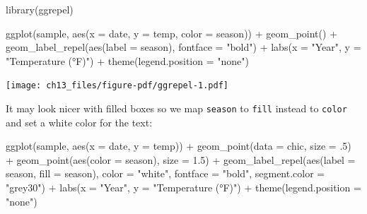 \documentclass[
  letterpaper,
]{scrbook}
\newenvironment{Shaded}{\begin{snugshade}}{\end{snugshade}}
\newcommand{\AttributeTok}[1]{\textcolor[rgb]{0.40,0.45,0.13}{#1}}
\newcommand{\DecValTok}[1]{\textcolor[rgb]{0.68,0.00,0.00}{#1}}
\newcommand{\FloatTok}[1]{\textcolor[rgb]{0.68,0.00,0.00}{#1}}
\newcommand{\FunctionTok}[1]{\textcolor[rgb]{0.28,0.35,0.67}{#1}}
\newcommand{\NormalTok}[1]{\textcolor[rgb]{0.00,0.23,0.31}{#1}}
\newcommand{\SpecialCharTok}[1]{\textcolor[rgb]{0.37,0.37,0.37}{#1}}
\newcommand{\StringTok}[1]{\textcolor[rgb]{0.13,0.47,0.30}{#1}}
\begin{document}
\begin{Shaded}
\begin{Highlighting}[]
\FunctionTok{library}\NormalTok{(ggrepel)}

\FunctionTok{ggplot}\NormalTok{(sample, }\FunctionTok{aes}\NormalTok{(}\AttributeTok{x =}\NormalTok{ date, }\AttributeTok{y =}\NormalTok{ temp, }\AttributeTok{color =}\NormalTok{ season)) }\SpecialCharTok{+}
  \FunctionTok{geom\_point}\NormalTok{() }\SpecialCharTok{+}
  \FunctionTok{geom\_label\_repel}\NormalTok{(}\FunctionTok{aes}\NormalTok{(}\AttributeTok{label =}\NormalTok{ season), }\AttributeTok{fontface =} \StringTok{"bold"}\NormalTok{) }\SpecialCharTok{+}
  \FunctionTok{labs}\NormalTok{(}\AttributeTok{x =} \StringTok{"Year"}\NormalTok{, }\AttributeTok{y =} \StringTok{"Temperature (°F)"}\NormalTok{) }\SpecialCharTok{+}
  \FunctionTok{theme}\NormalTok{(}\AttributeTok{legend.position =} \StringTok{"none"}\NormalTok{)}
\end{Highlighting}
\end{Shaded}

\texttt{[image: ch13\_files/figure-pdf/ggrepel-1.pdf]}

It may look nicer with filled boxes so we map \texttt{season} to
\texttt{fill} instead to \texttt{color} and set a white color for the
text:

\begin{Shaded}
\begin{Highlighting}[]
\FunctionTok{ggplot}\NormalTok{(sample, }\FunctionTok{aes}\NormalTok{(}\AttributeTok{x =}\NormalTok{ date, }\AttributeTok{y =}\NormalTok{ temp)) }\SpecialCharTok{+}
  \FunctionTok{geom\_point}\NormalTok{(}\AttributeTok{data =}\NormalTok{ chic, }\AttributeTok{size =}\NormalTok{ .}\DecValTok{5}\NormalTok{) }\SpecialCharTok{+}
  \FunctionTok{geom\_point}\NormalTok{(}\FunctionTok{aes}\NormalTok{(}\AttributeTok{color =}\NormalTok{ season), }\AttributeTok{size =} \FloatTok{1.5}\NormalTok{) }\SpecialCharTok{+}
  \FunctionTok{geom\_label\_repel}\NormalTok{(}\FunctionTok{aes}\NormalTok{(}\AttributeTok{label =}\NormalTok{ season, }\AttributeTok{fill =}\NormalTok{ season),}
                   \AttributeTok{color =} \StringTok{"white"}\NormalTok{, }\AttributeTok{fontface =} \StringTok{"bold"}\NormalTok{,}
                   \AttributeTok{segment.color =} \StringTok{"grey30"}\NormalTok{) }\SpecialCharTok{+}
  \FunctionTok{labs}\NormalTok{(}\AttributeTok{x =} \StringTok{"Year"}\NormalTok{, }\AttributeTok{y =} \StringTok{"Temperature (°F)"}\NormalTok{) }\SpecialCharTok{+}
  \FunctionTok{theme}\NormalTok{(}\AttributeTok{legend.position =} \StringTok{"none"}\NormalTok{)}
\end{Highlighting}
\end{Shaded}
\end{document}
